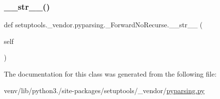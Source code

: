 \subsubsection{\texorpdfstring{\+\_\+\+\_\+str\+\_\+\+\_\+()}{\_\_str\_\_()}}
{\footnotesize\ttfamily def setuptools.\+\_\+vendor.\+pyparsing.\+\_\+\+Forward\+No\+Recurse.\+\_\+\+\_\+str\+\_\+\+\_\+ (\begin{DoxyParamCaption}\item[{}]{self }\end{DoxyParamCaption})}



The documentation for this class was generated from the following file\+:\begin{DoxyCompactItemize}
\item 
venv/lib/python3./site-\/packages/setuptools/\+\_\+vendor/\hyperlink{setuptools_2__vendor_2pyparsing_8py}{pyparsing.\+py}\end{DoxyCompactItemize}
